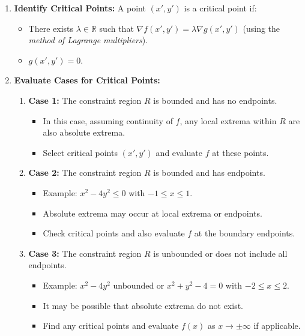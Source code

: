 \documentclass{report}
\begin{document}
\begin{enumerate}
	\item \textbf{Identify Critical Points:} A point \( (x', y') \) is a critical point if:
	      \begin{itemize}
		      \item There exists \( \lambda \in \mathbb{R} \) such that \( \nabla f(x', y') = \lambda \nabla g(x', y') \) (using the \emph{method of Lagrange multipliers}).
		      \item \( g(x', y') = 0 \).
	      \end{itemize}

	\item \textbf{Evaluate Cases for Critical Points:}
	      \begin{enumerate}
		      \item \textbf{Case 1:} The constraint region \( R \) is bounded and has no endpoints.
		            \begin{itemize}
			            \item In this case, assuming continuity of \( f \), any local extrema within \( R \) are also absolute extrema.
			            \item Select critical points \( (x', y') \) and evaluate \( f \) at these points.
		            \end{itemize}

		      \item \textbf{Case 2:} The constraint region \( R \) is bounded and has endpoints.
		            \begin{itemize}
			            \item Example: \( x^2 - 4y^2 \leq 0 \) with \( -1 \leq x \leq 1 \).
			            \item Absolute extrema may occur at local extrema or endpoints.
			            \item Check critical points and also evaluate \( f \) at the boundary endpoints.
		            \end{itemize}

		      \item \textbf{Case 3:} The constraint region \( R \) is unbounded or does not include all endpoints.
		            \begin{itemize}
			            \item Example: \( x^2 - 4y^2 \) unbounded or \( x^2 + y^2 - 4 = 0 \) with \( -2 \leq x \leq 2 \).
			            \item It may be possible that absolute extrema do not exist.
			            \item Find any critical points and evaluate \( f(x) \) as \( x \rightarrow \pm \infty \) if applicable.
		            \end{itemize}
	      \end{enumerate}
\end{enumerate}
\end{document}
